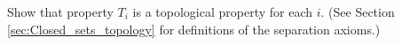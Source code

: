 \begin{comment}
\item The function $f$ from $(X, \{\emptyset, \{r\}, \{s\}, \{r,s\}, \{r,t\}, X\})$ to \\ $(X, \{\emptyset, \{u\}, \{v\}, \{u,v\}, \{u,w\}, X\})$ is a homeomorphism. Thus, $(X, \tau_1)$ and $(X, \tau_2)$ are homeomorphic if $\tau_1$ and $\tau_2$ are any topologies in group 6. 

\end{itemize}

This produces 9 homeomorphism classes, one with the indiscrete topology, the group 1 topologies, the group 2 topologies, the group 3a and 3b topologies, the group 4 topologies, the group 5 topologies, the group 6 topologies, and the discrete topology. The topologies for the distinct homeomorphism classes are shown in the table below. 

\begin{multicols}{2}
\begin{enumerate}[1.]

\item $\{\emptyset, X\}$

\item $\{\emptyset, \{a,b\}, X\}$

\item $\{\emptyset, \{a\}, X\}$

\item $\{\emptyset, \{a\}, \{a,b\}, X\}$

\item $\{\emptyset, \{a\}, \{b,c\}, X\}$

\item $\{\emptyset, \{a\}, \{a,b\}, \{a,c\}, X\}$

\item $\{\emptyset, \{a\}, \{b\}, \{a,b\}, X\}$

\item $\{\emptyset, \{a\}, \{b\}, \{a,c\}, \{b,c\}, X\}$

\item the discrete topology

\end{enumerate}

\end{multicols}

\end{comment}

\item Show that property $T_i$ is a topological property for each $i$. (See Section \ref{sec:Closed_sets_topology} for definitions of the separation axioms.) 

